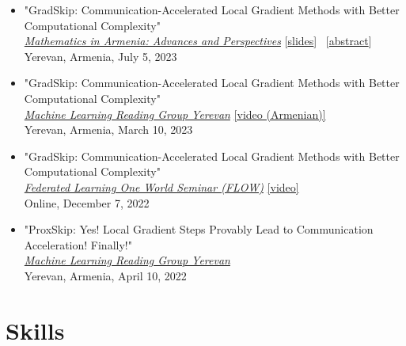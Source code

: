 \documentclass[11pt,a4paper,sans]{moderncv}        %
\begin{document}
\begin{itemize}

\item "GradSkip: Communication-Accelerated Local Gradient Methods with Better Computational Complexity"\\
\textcolor{accent}{\href{http://mathconf.sci.am/index.html}{\textit{Mathematics in Armenia: Advances and Perspectives}}} [\href{https://artomaranjyan.github.io/files/talk4slide.pdf}{slides}] \  [\href{http://mathconf.sci.am/MiA2023AbstractsBook.pdf#page=60}{abstract}]\\
Yerevan, Armenia, July 5, 2023 

\item "GradSkip: Communication-Accelerated Local Gradient Methods with Better Computational Complexity"\\
\textcolor{accent}{\href{https://groups.google.com/g/ml-reading-group-yerevan/c/F_1OGqeFImY/m/BGDIqZAWBQAJ}{\textit{Machine Learning Reading Group Yerevan}}} \textcolor{orange}{\href{https://www.youtube.com/watch?v=w9iHPgE82oo}{[video (Armenian)]}}\\
Yerevan, Armenia, March 10, 2023

\item "GradSkip: Communication-Accelerated Local Gradient Methods with Better Computational Complexity"\\
\textcolor{accent}{\href{https://sites.google.com/view/one-world-seminar-series-flow/archive/2022?authuser=0\#h.99nho9x1b8ju}{\textit{Federated Learning One World Seminar (FLOW)}}} \textcolor{orange}{\href{https://youtu.be/WWhY5tO-FiM}{[video]}}\\
Online, December 7, 2022

\item "ProxSkip: Yes! Local Gradient Steps Provably Lead to Communication Acceleration! Finally!"\\
\textcolor{accent}{\href{https://groups.google.com/g/ml-reading-group-yerevan/c/-TZmYEWATuI}{\textit{Machine Learning Reading Group Yerevan}}}\\
Yerevan, Armenia, April 10, 2022
\end{itemize}


\section{Skills}
\end{document}
